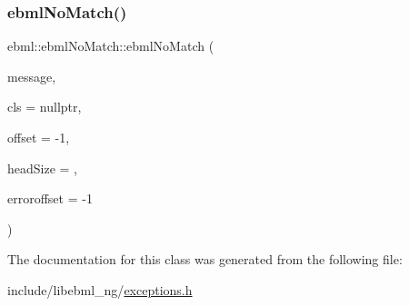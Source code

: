 \subsubsection{\texorpdfstring{ebml\+No\+Match()}{ebmlNoMatch()}}
{\footnotesize\ttfamily ebml\+::ebml\+No\+Match\+::ebml\+No\+Match (\begin{DoxyParamCaption}\item[{const std\+::string \&}]{message,  }\item[{const \mbox{\hyperlink{classebml_1_1ebmlElementClass}{ebml\+Element\+Class}} $\ast$}]{cls = {\ttfamily nullptr},  }\item[{off\+\_\+t}]{offset = {\ttfamily -\/1},  }\item[{unsigned char}]{head\+Size = {},  }\item[{off\+\_\+t}]{erroroffset = {\ttfamily -\/1} }\end{DoxyParamCaption})}



The documentation for this class was generated from the following file\+:\begin{DoxyCompactItemize}
\item 
include/libebml\+\_\+ng/\mbox{\hyperlink{exceptions_8h}{exceptions.\+h}}\end{DoxyCompactItemize}
